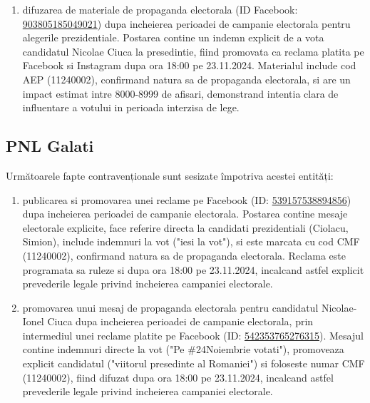 \documentclass[a4paper,12pt]{article}
\begin{document}
\begin{enumerate}[leftmargin=*, label=\arabic*.)]
    \item difuzarea de materiale de propaganda electorala (ID Facebook: \href{https://www.facebook.com/ads/library/?id=903805185049021}{903805185049021}) dupa incheierea perioadei de campanie electorala pentru alegerile prezidentiale. Postarea contine un indemn explicit de a vota candidatul Nicolae Ciuca la presedintie, fiind promovata ca reclama platita pe Facebook si Instagram dupa ora 18:00 pe 23.11.2024. Materialul include cod AEP (11240002), confirmand natura sa de propaganda electorala, si are un impact estimat intre 8000-8999 de afisari, demonstrand intentia clara de influentare a votului in perioada interzisa de lege.
\end{enumerate}

\vspace{0.5cm}

\subsection{PNL Galati}
Următoarele fapte contravenționale sunt sesizate împotriva acestei entități:

\begin{enumerate}[leftmargin=*, label=\arabic*.)]
    \item publicarea si promovarea unei reclame pe Facebook (ID: \href{https://www.facebook.com/ads/library/?id=539157538894856}{539157538894856}) dupa incheierea perioadei de campanie electorala. Postarea contine mesaje electorale explicite, face referire directa la candidati prezidentiali (Ciolacu, Simion), include indemnuri la vot ("iesi la vot"), si este marcata cu cod CMF (11240002), confirmand natura sa de propaganda electorala. Reclama este programata sa ruleze si dupa ora 18:00 pe 23.11.2024, incalcand astfel explicit prevederile legale privind incheierea campaniei electorale.
    \item promovarea unui mesaj de propaganda electorala pentru candidatul Nicolae-Ionel Ciuca dupa incheierea perioadei de campanie electorala, prin intermediul unei reclame platite pe Facebook (ID: \href{https://www.facebook.com/ads/library/?id=542353765276315}{542353765276315}). Mesajul contine indemnuri directe la vot ("Pe \#24Noiembrie votati"), promoveaza explicit candidatul ("viitorul presedinte al Romaniei") si foloseste numar CMF (11240002), fiind difuzat dupa ora 18:00 pe 23.11.2024, incalcand astfel prevederile legale privind incheierea campaniei electorale.
\end{enumerate}
\end{document}
